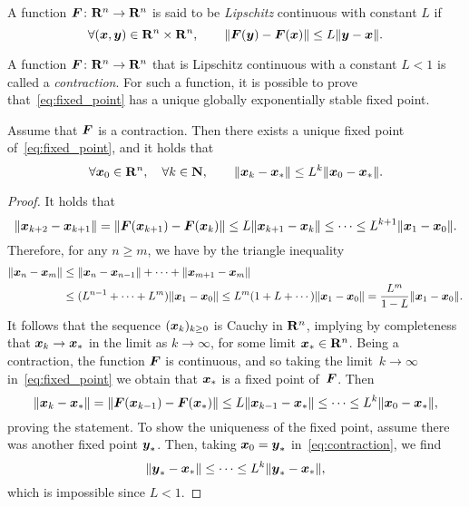 \begin{definition}
    A function $\mathbf{\boldsymbol{F}}\colon \mathbf R^n \to \mathbf R^n$ is said to be \emph{Lipschitz} continuous
    with constant $L$ if
    \[
        \forall (\vect x, \vect y) \in \real^n \times \real^n, \qquad
        \norm[big]{\vect F(\vect y) - \vect F(\vect x)} \leq L \norm{\vect y - \vect x}.
    \]
\end{definition}
A function $\mathbf{\boldsymbol{F}}\colon \mathbf R^n \to \mathbf R^n$ that is Lipschitz continuous with a constant $L < 1$ is called a \emph{contraction}.
For such a function, it is possible to prove that~\eqref{eq:fixed_point} has a unique globally exponentially stable fixed point.
\begin{theorem}
    \label{eq:exponenital_convergence_fixed_point}
    Assume that $\mathbf{\boldsymbol{F}}$ is a contraction.
    Then there exists a unique fixed point of~\eqref{eq:fixed_point},
    and it holds that
    \[
        \forall \mathbf{\boldsymbol{x}}_0 \in \mathbf R^n,
        \quad \forall k \in \mathbf N, \qquad
        \lVert\mathbf{\boldsymbol{x}}_k - \mathbf{\boldsymbol{x}}_*\rVert \leq L^k \lVert\mathbf{\boldsymbol{x}}_0 - \mathbf{\boldsymbol{x}}_*\rVert.
    \]
\end{theorem}
\begin{proof}
    It holds that
    \[
        \norm[big]{\vect x_{k+2} - \vect x_{k+1}}
        = \norm[big]{\vect F(\vect x_{k+1}) - \vect F(\vect x_k)}
        \leq L\norm{\vect x_{k+1} - \vect x_k}
        \leq \dots \leq L^{k+1} \norm{\vect x_{1} - \vect x_0}.
    \]
    Therefore, for any $n \geq m$,
    we have by the triangle inequality
    \begin{align*}
        \lVert\mathbf{\boldsymbol{x}}_{n} - \mathbf{\boldsymbol{x}}_{m}\rVert
        &\leq \lVert\mathbf{\boldsymbol{x}}_{n} - \mathbf{\boldsymbol{x}}_{n-1}\rVert + \dotsb + \lVert\mathbf{\boldsymbol{x}}_{m+1} - \mathbf{\boldsymbol{x}}_{m}\rVert \\
        &\leq (L^{n-1} + \dotsb + L^{m}) \lVert\mathbf{\boldsymbol{x}}_{1} - \mathbf{\boldsymbol{x}}_0\rVert
        \leq L^{m} (1 + L + \dotsb) \lVert\mathbf{\boldsymbol{x}}_{1} - \mathbf{\boldsymbol{x}}_0\rVert
        = \frac{L^{m}}{1-L} \lVert\mathbf{\boldsymbol{x}}_{1} - \mathbf{\boldsymbol{x}}_0\rVert.
    \end{align*}
    It follows that the sequence $(\mathbf{\boldsymbol{x}}_k)_{k\geq0}$ is Cauchy in $\mathbf R^n$,
    implying by completeness that $\mathbf{\boldsymbol{x}}_k \to \mathbf{\boldsymbol{x}}_*$ in the limit as $k \to \infty$,
    for some limit $\mathbf{\boldsymbol{x}}_* \in \mathbf R^n$.
    Being a contraction, the function $\mathbf{\boldsymbol{F}}$ is continuous,
    and so taking the limit~$k \to \infty$ in~\eqref{eq:fixed_point} we obtain that $\mathbf{\boldsymbol{x}}_*$ is a fixed point of~$\mathbf{\boldsymbol{F}}$.
    Then
    \begin{equation}
        \label{eq:contraction}
        \norm[big]{\vect x_{k} - \vect x_{*}}
        = \norm[big]{\vect F(\vect x_{k-1}) - \vect F(\vect x_*)}
        \leq L\norm{\vect x_{k-1} - \vect x_*}
        \leq \dots \leq L^{k} \norm{\vect x_{0} - \vect x_*},
    \end{equation}
    proving the statement.
    To show the uniqueness of the fixed point,
    assume there was another fixed point $\mathbf{\boldsymbol{y}}_*$.
    Then, taking $\mathbf{\boldsymbol{x}}_0 = \mathbf{\boldsymbol{y}}_*$ in~\eqref{eq:contraction},
    we find
    \begin{equation*}
        \norm[big]{\vect y_* - \vect x_{*}}
        \leq \dots \leq L^{k} \norm{\vect y_* - \vect x_*},
    \end{equation*}
    which is impossible since $L < 1$.
\end{proof}

